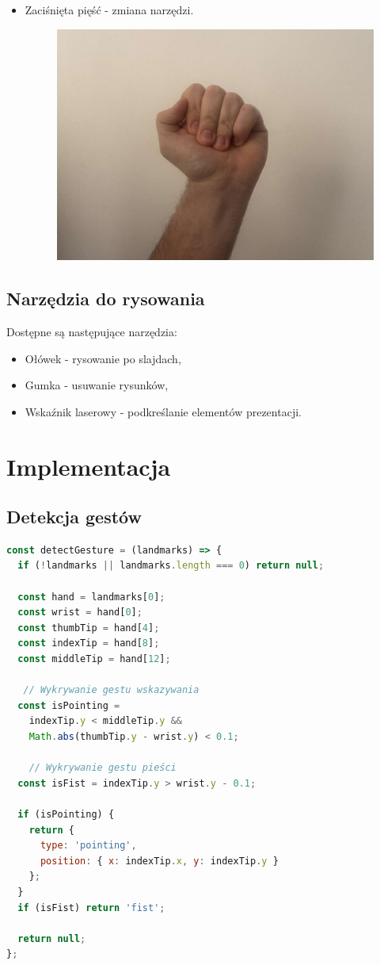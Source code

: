 \documentclass[12pt,a4paper]{article}
\begin{document}
\begin{itemize}
\begin{figure}[H]
    \end{figure}
    \item Zaciśnięta pięść - zmiana narzędzi.
    \begin{figure}[H]
      \includegraphics[width=\textwidth]{images/piesc.jpg}
    \end{figure}
\end{itemize}

\subsection{Narzędzia do rysowania}
Dostępne są następujące narzędzia:
\begin{itemize}
    \item Ołówek - rysowanie po slajdach,
    \item Gumka - usuwanie rysunków,
    \item Wskaźnik laserowy - podkreślanie elementów prezentacji.
\end{itemize}
\section{Implementacja}
\subsection{Detekcja gestów}
\begin{lstlisting}[language=JavaScript]
const detectGesture = (landmarks) => {
  if (!landmarks || landmarks.length === 0) return null;

  const hand = landmarks[0];
  const wrist = hand[0];
  const thumbTip = hand[4];
  const indexTip = hand[8];
  const middleTip = hand[12];
  
   // Wykrywanie gestu wskazywania
  const isPointing = 
    indexTip.y < middleTip.y && 
    Math.abs(thumbTip.y - wrist.y) < 0.1;

    // Wykrywanie gestu pieści
  const isFist = indexTip.y > wrist.y - 0.1;

  if (isPointing) {
    return {
      type: 'pointing',
      position: { x: indexTip.x, y: indexTip.y }
    };
  }
  if (isFist) return 'fist';
  
  return null;
};
\end{lstlisting}
\end{document}
